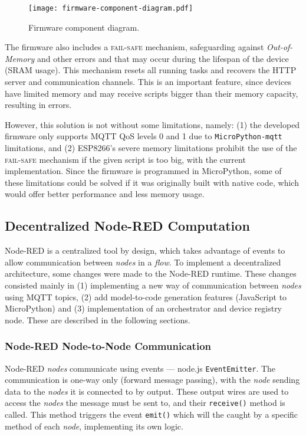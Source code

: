 \begin{figure}[h]
    \centering
    \texttt{[image: firmware-component-diagram.pdf]}
    \caption{Firmware component diagram.}
    \label{fig:firmware_component_diagram}
\end{figure}

The firmware also includes a \textsc{fail-safe} mechanism, safeguarding against \textit{Out-of-Memory} and other errors and that may occur during the lifespan of the device (SRAM usage). This mechanism resets all running tasks and recovers the HTTP server and communication channels. This is an important feature, since devices have limited memory and may receive scripts bigger than their memory capacity, resulting in errors.

However, this solution is not without some limitations, namely: (1) the developed firmware only supports MQTT QoS levels 0 and 1 due to \texttt{MicroPython-mqtt} limitations, and (2) ESP8266's severe memory limitations prohibit the use of the \textsc{fail-safe} mechanism if the given script is too big, with the current implementation. Since the firmware is programmed in MicroPython, some of these limitations could be solved if it was originally built with native code, which would offer better performance and less memory usage.

\subsection{Decentralized Node-RED Computation}\label{sec:node_red_decentralization}

Node-RED is a centralized tool by design, which takes advantage of events to allow communication between \textit{nodes} in a \textit{flow}. To implement a decentralized architecture, some changes were made to the Node-RED runtime. These changes consisted mainly in (1) implementing a new way of communication between \textit{nodes} using MQTT topics, (2) add model-to-code generation features (\ie JavaScript to MicroPython) and (3) implementation of an orchestrator and device registry node. These are described in the following sections.

\subsubsection{Node-RED Node-to-Node Communication}\label{sec:mqtt_support}

Node-RED \textit{nodes} communicate using events --- node.js \texttt{EventEmitter}. The communication is one-way only (forward message passing), with the \textit{node} sending data to the \textit{nodes} it is connected to by output. These output wires are used to access the \textit{nodes} the message must be sent to, and their \texttt{receive()} method is called. This method triggers the event \texttt{emit()} which will the caught by a specific method of each \textit{node}, implementing its own logic.

